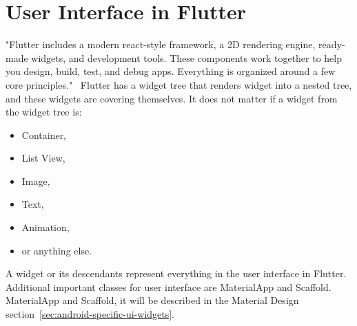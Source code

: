 \section{User Interface in Flutter}\label{sec:flutter-user-interface}
"Flutter includes a modern react-style framework, a 2D rendering engine, ready-made widgets, and development tools.
These components work together to help you design, build, test, and debug apps.
Everything is organized around a few core principles."~\cite{flutterTechnicalOverview}
Flutter has a widget tree that renders widget into a nested tree, and these widgets are covering themselves.
It does not matter if a widget from the widget tree is:
\begin{itemize}
    \item Container,
    \item List View,
    \item Image,
    \item Text,
    \item Animation,
    \item or anything else.
\end{itemize}
A widget or its descendants represent everything in the user interface in Flutter.
Additional important classes for user interface are MaterialApp and Scaffold.~\cite{flutterBook}
MaterialApp and Scaffold, it will be described in the Material Design section~\ref{sec:android-specific-ui-widgets}.

